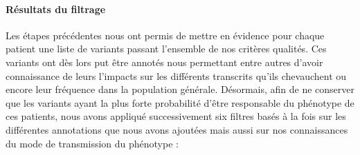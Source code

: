\documentclass[12pt,twoside]{reedthesis}
\theoremstyle{definition}
\theoremstyle{definition}
\theoremstyle{remark}
\begin{document}
  \newpage
  
  \hypertarget{filterdescription}{\paragraph{Résultats du
  filtrage}\label{filterdescription}}
  
  Les étapes précédentes nous ont permis de mettre en évidence pour chaque
  patient une liste de variants passant l'ensemble de nos critères
  qualités. Ces variants ont dès lors put être annotés nous permettant
  entre autres d'avoir connaissance de leurs l'impacts sur les différents
  transcrits qu'ils chevauchent ou encore leur fréquence dans la
  population générale. Désormais, afin de ne conserver que les variants
  ayant la plus forte probabilité d'être responsable du phénotype de ces
  patients, nous avons appliqué successivement six filtres basés à la fois
  sur les différentes annotations que nous avons ajoutées mais aussi sur
  nos connaissances du mode de transmission du phénotype :
  
\end{document}
